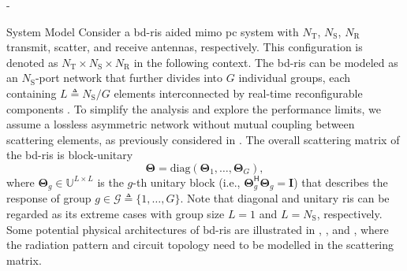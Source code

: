 \begin{section}{-}

	\begin{subsection}{System Model}
		Consider a \gls{bd}-\gls{ris} aided \gls{mimo} \gls{pc} system with $N_\mathrm{T}$, $N_\mathrm{S}$, $N_\mathrm{R}$ transmit, scatter, and receive antennas, respectively.
		This configuration is denoted as $N_\mathrm{T} \times N_\mathrm{S} \times N_\mathrm{R}$ in the following context.
		The \gls{bd}-\gls{ris} can be modeled as an $N_\mathrm{S}$-port network \cite{Ivrlac2010} that further divides into $G$ individual groups, each containing $L \triangleq N_\mathrm{S} / G$ elements interconnected by real-time reconfigurable components \cite{Shen2020a}.
		To simplify the analysis and explore the performance limits, we assume a lossless asymmetric network without mutual coupling between scattering elements, as previously considered in \cite{Li2023b,Li2023c,Bartoli2023}.
		The overall scattering matrix of the \gls{bd}-\gls{ris} is block-unitary
		\begin{equation}
			\mathbf{\Theta} = \mathrm{diag}(\mathbf{\Theta}_1,\ldots,\mathbf{\Theta}_G),
			\label{eq:bd_ris}
		\end{equation}
		where $\mathbf{\Theta}_g \in \mathbb{U}^{L \times L}$ is the $g$-th unitary block (i.e., $\mathbf{\Theta}_g^\mathsf{H} \mathbf{\Theta}_g = \mathbf{I}$) that describes the response of group $g \in \mathcal{G} \triangleq \{1, \ldots, G\}$.
		Note that diagonal and unitary \gls{ris} can be regarded as its extreme cases with group size $L=1$ and $L=N_\mathrm{S}$, respectively.
		Some potential physical architectures of \gls{bd}-\gls{ris} are illustrated in \cite[Fig. 3]{Shen2020a}, \cite[Fig. 5]{Li2023c}, and \cite[Fig. 2]{Nerini2024}, where the radiation pattern and circuit topology need to be modelled in the scattering matrix.


\end{subsection}
\end{section}
